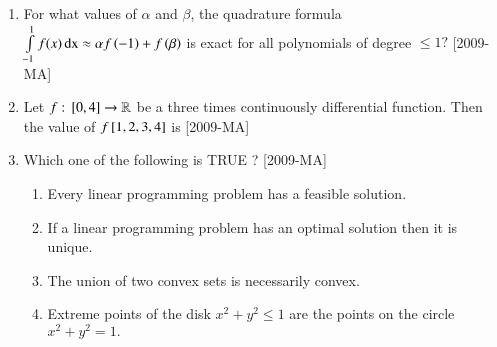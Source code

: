 \documentclass[journal]{IEEEtran}
\begin{document}
\begin{enumerate}
\item For what values of $\alpha$ and $\beta$, the quadrature formula $\int \limits_{-1}^1 f(x)\, \text{dx} \approx \alpha f\left(-1\right)+f\left(\beta\right)$ is exact for all polynomials of degree $\leq 1 ?$ \hfill{[2009-MA]}
\begin{enumerate}
\end{enumerate}

\item Let $f:{}\left[0,4\right] \rightarrow \mathbb R$ be a three times continuously differential function. Then the value of $f{}\left[1,2,3,4\right]$ is \hfill{[2009-MA]}
\begin{enumerate}
\end{enumerate}

\item Which one of the following is TRUE ? \hfill{[2009-MA]}

\begin{enumerate}
    \item Every linear programming problem has a feasible solution.
    \item If a linear programming problem has an optimal solution then it is unique.
    \item The union of two convex sets is necessarily convex.
    \item Extreme points of the disk $x^2+y^2 \leq 1$ are the points on the circle $x^2+y^2=1.$
\end{enumerate}


\end{enumerate}
\end{document}
